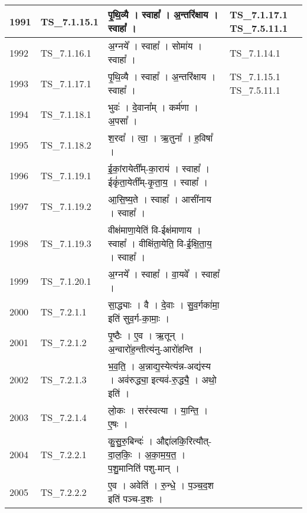 \documentclass[17pt]{extarticle}
\begin{document}
\begin{longtable}{||p{0.4in}||p{0.9in}||p{4.0in}||p{0.9in}||}
        \hline
            1991 & TS\_7.1.15.1 & पृ॒थि॒व्यै   ।   स्वाहा᳚   ।   अ॒न्तरि॑क्षाय   ।   स्वाहा᳚   ।    &  TS\_7.1.17.1 TS\_7.5.11.1       \\
        \hline
            1992 & TS\_7.1.16.1 & अ॒ग्नये᳚   ।   स्वाहा᳚   ।   सोमा॑य   ।   स्वाहा᳚   ।    & TS\_7.1.14.1        \\
        \hline
            1993 & TS\_7.1.17.1 & पृ॒थि॒व्यै   ।   स्वाहा᳚   ।   अ॒न्तरि॑क्षाय   ।   स्वाहा᳚   ।    & TS\_7.1.15.1  TS\_7.5.11.1       \\
        \hline
            1994 & TS\_7.1.18.1 & भुवः॑   ।   दे॒वाना᳚म्   ।   कर्म॑णा   ।   अ॒पसा᳚   ।    &      \\
        \hline
            1995 & TS\_7.1.18.2 & श॒रदा᳚   ।   त्वा॒   ।   ऋ॒तुना᳚   ।   ह॒विषा᳚   ।    &      \\
        \hline
            1996 & TS\_7.1.19.1 & ई॒कां॒रायेती᳚म्{-}का॒राय॑   ।   स्वाहा᳚   ।   ईकृं॑ता॒येती᳚म्{-}कृ॒ता॒य॒   ।   स्वाहा᳚   ।    &      \\
        \hline
            1997 & TS\_7.1.19.2 & आ॒सि॒ष्य॒ते   ।   स्वाहा᳚   ।   आसी॑नाय   ।   स्वाहा᳚   ।    &      \\
        \hline
            1998 & TS\_7.1.19.3 & वीक्ष॑माणा॒येति॑ वि{-}ईक्ष॑माणाय   ।   स्वाहा᳚   ।   वीक्षि॑ता॒येति॒ वि{-}ई॒क्षि॒ता॒य॒   ।   स्वाहा᳚   ।    &      \\
        \hline
            1999 & TS\_7.1.20.1 & अ॒ग्नये᳚   ।   स्वाहा᳚   ।   वा॒यवे᳚   ।   स्वाहा᳚   ।    &      \\
        \hline
            2000 & TS\_7.2.1.1 & सा॒द्ध्याः   ।   वै   ।   दे॒वाः   ।   सु॒व॒र्गका॑मा॒ इति॑ सुव॒र्ग{-}का॒माः॒   ।    &      \\
        \hline
            2001 & TS\_7.2.1.2 & पृ॒ष्ठैः   ।   ए॒व   ।   ऋ॒तून्   ।   अ॒न्वारो॑ह॒न्तीत्य॑नु{-}आरो॑हन्ति   ।    &      \\
        \hline
            2002 & TS\_7.2.1.3 & भ॒व॒ति॒   ।   अ॒न्नाद्य॒स्येत्य॑न्न{-}अद्य॑स्य   ।   अव॑रुद्ध्या॒ इत्यव॑{-}रु॒द्ध्यै॒   ।   अथो॒ इति॑   ।    &      \\
        \hline
            2003 & TS\_7.2.1.4 & लो॒कः   ।   सर॑स्वत्या   ।   या॒न्ति॒   ।   ए॒षः   ।    &      \\
        \hline
            2004 & TS\_7.2.2.1 & कु॒सु॒रु॒बिन्दः॑   ।   औद्दा॑लकि॒रित्यौत्{-}दा॒ल॒किः॒   ।   अ॒का॒म॒य॒त॒   ।   प॒शु॒मानिति॑ पशु{-}मान्   ।    &      \\
        \hline
            2005 & TS\_7.2.2.2 & ए॒व   ।   अवेति॑   ।   रु॒न्धे॒   ।   प॒ञ्च॒द॒श इति॑ पञ्च{-}द॒शः   ।    &      \\

\end{longtable}
\end{document}
